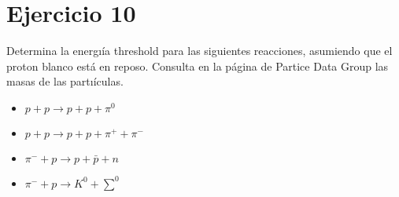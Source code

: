 \section*{Ejercicio 10}
Determina la energıía threshold para las siguientes reacciones, asumiendo que el proton blanco está
en reposo. Consulta en la página de Partice Data Group las masas de las partıículas.
\begin{itemize}
    \item $p+p \rightarrow p+p+\pi^0$
    \item $p+p \rightarrow p+p+\pi^++\pi^-$
    \item $\pi^-+p \rightarrow p+\bar{p}+n$
    \item $\pi^-+p \rightarrow K^0+\sum^0$
\end{itemize}